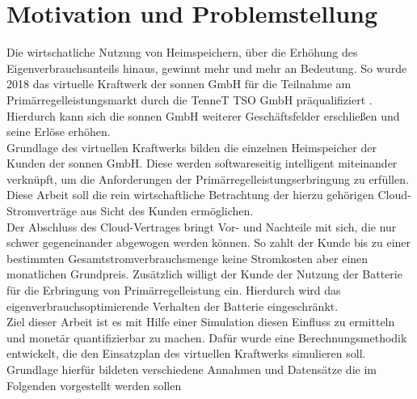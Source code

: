 
\section{Motivation und Problemstellung}

Die wirtschatliche Nutzung von Heimspeichern, über die Erhöhung des Eigenverbrauchsanteils hinaus, gewinnt mehr und mehr an Bedeutung. So wurde 2018 das virtuelle Kraftwerk der sonnen GmbH für die Teilnahme am Primärregelleistungsmarkt durch die TenneT TSO GmbH präqualifiziert \parencite{tennet18}. Hierdurch kann sich die sonnen GmbH weiterer Geschäftsfelder erschließen und seine Erlöse erhöhen.\medskip\\
Grundlage des virtuellen Kraftwerks bilden die einzelnen Heimspeicher der Kunden der sonnen GmbH. Diese werden softwareseitig intelligent miteinander verknüpft, um die Anforderungen der Primärregelleistungserbringung zu erfüllen. Diese Arbeit soll die rein wirtschaftliche Betrachtung der hierzu gehörigen Cloud-Stromverträge aus Sicht des Kunden ermöglichen.\medskip\\
Der Abschluss des Cloud-Vertrages bringt Vor- und Nachteile mit sich, die nur schwer gegeneinander abgewogen werden können. So zahlt der Kunde bis zu einer bestimmten Gesamtstromverbrauchsmenge keine Stromkosten aber einen monatlichen Grundpreis. Zusätzlich willigt der Kunde der Nutzung der Batterie für die Erbringung von Primärregelleistung ein. Hierdurch wird das eigenverbrauchsoptimierende Verhalten der Batterie eingeschränkt.\medskip\\
Ziel dieser Arbeit ist es mit Hilfe einer Simulation diesen Einfluss zu ermitteln und monetär quantifizierbar zu machen. Dafür wurde eine Berechnungsmethodik entwickelt, die den Einsatzplan des virtuellen Kraftwerks simulieren soll. Grundlage hierfür bildeten verschiedene Annahmen und Datensätze die im Folgenden vorgestellt werden sollen
